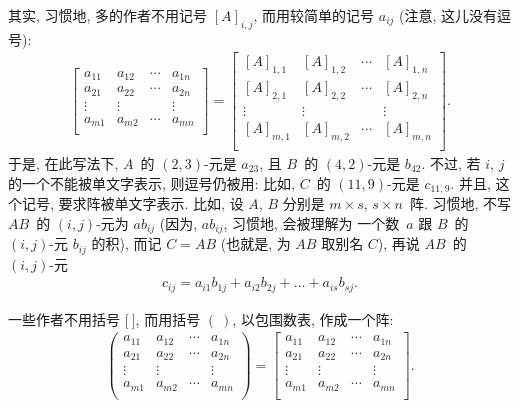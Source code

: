 \documentclass[../libro.tex]{subfiles}
\begin{document}
其实, 习惯地,
多的作者不用记号 \([A]_{i,j}\),
而用较简单的记号 \(a_{ij}\)
(注意, 这儿没有逗号):
\begin{align*}
    \begin{bmatrix}
        a_{11} & a_{12} & \cdots & a_{1n} \\
        a_{21} & a_{22} & \cdots & a_{2n} \\
        \vdots & \vdots & {}     & \vdots \\
        a_{m1} & a_{m2} & \cdots & a_{mn} \\
    \end{bmatrix}
    =
    \begin{bmatrix}
        [A]_{1,1} & [A]_{1,2} & \cdots & [A]_{1,n} \\
        [A]_{2,1} & [A]_{2,2} & \cdots & [A]_{2,n} \\
        \vdots    & \vdots    & {}     & \vdots    \\
        [A]_{m,1} & [A]_{m,2} & \cdots & [A]_{m,n} \\
    \end{bmatrix}.
\end{align*}
于是, 在此写法下,
\(A\)~的 \((2, 3)\)-元是 \(a_{23}\),
且 \(B\)~的 \((4, 2)\)-元是 \(b_{42}\).
不过, 若 \(i\), \(j\) 的一个不能被单文字表示,
则逗号仍被用:
比如, \(C\)~的 \((11, 9)\)-元是 \(c_{11,9}\).
并且, 这个记号, 要求阵被单文字表示.
比如, 设 \(A\), \(B\) 分别是
\(m \times s\), \(s \times n\)~阵.
习惯地, 不写 \(AB\)~的 \((i, j)\)-元为
\({ab}_{ij}\)
(因为, \({ab}_{ij}\), %
习惯地,
会被理解为%
一个数~\(a\) 跟
\(B\)~的 \((i, j)\)-元 \(b_{ij}\)
的积), %
而记 \(C = AB\)
(也就是, 为 \(AB\) 取别名 \(C\)),
再说 \(AB\)~的 \((i, j)\)-元
\begin{align*}
    c_{ij}
    = a_{i1} b_{1j} + a_{i2} b_{2j} + \dots
    + a_{is} b_{sj}.
\end{align*}

一些作者不用括号 \({[} \ {]}\),
而用括号 \(( \ )\),
以包围数表, 作成一个阵:
\begin{align*}
    \begin{pmatrix}
        a_{11} & a_{12} & \cdots & a_{1n} \\
        a_{21} & a_{22} & \cdots & a_{2n} \\
        \vdots & \vdots & {}     & \vdots \\
        a_{m1} & a_{m2} & \cdots & a_{mn} \\
    \end{pmatrix}
    =
    \begin{bmatrix}
        a_{11} & a_{12} & \cdots & a_{1n} \\
        a_{21} & a_{22} & \cdots & a_{2n} \\
        \vdots & \vdots & {}     & \vdots \\
        a_{m1} & a_{m2} & \cdots & a_{mn} \\
    \end{bmatrix}.
\end{align*}
\end{document}
